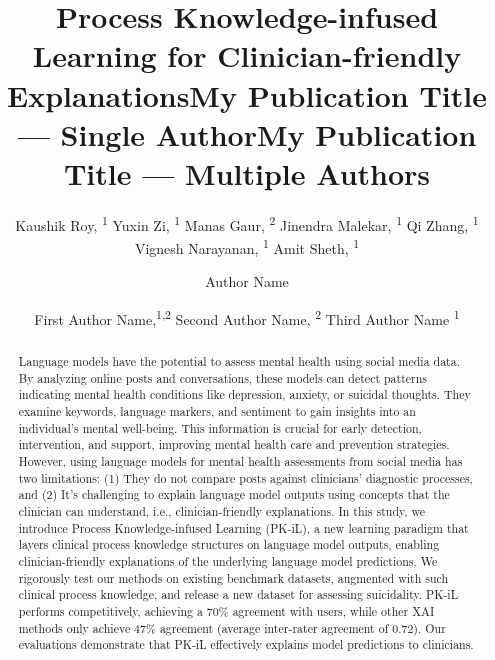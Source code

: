 \documentclass[letterpaper]{article} %
\title{Process Knowledge-infused Learning for Clinician-friendly Explanations}
\author{
    Kaushik Roy, \textsuperscript{\rm 1}
    Yuxin Zi, \textsuperscript{\rm 1}
    Manas Gaur, \textsuperscript{\rm 2}
    Jinendra Malekar, \textsuperscript{\rm 1}
    Qi Zhang, \textsuperscript{\rm 1}
    Vignesh Narayanan, \textsuperscript{\rm 1}
    Amit Sheth, \textsuperscript{\rm 1}
}
\title{My Publication Title --- Single Author}
\author {
    Author Name
}
\title{My Publication Title --- Multiple Authors}
\author {
    First Author Name,\textsuperscript{\rm 1,\rm 2}
    Second Author Name, \textsuperscript{\rm 2}
    Third Author Name \textsuperscript{\rm 1}
}
\begin{document}
\maketitle

\begin{abstract}
Language models have the potential to assess mental health using social media data. By analyzing online posts and conversations, these models can detect patterns indicating mental health conditions like depression, anxiety, or suicidal thoughts. They examine keywords, language markers, and sentiment to gain insights into an individual's mental well-being. This information is crucial for early detection, intervention, and support, improving mental health care and prevention strategies. However, using language models for mental health assessments from social media has two limitations: (1) They do not compare posts against clinicians' diagnostic processes, and (2) It's challenging to explain language model outputs using concepts that the clinician can understand, i.e., clinician-friendly explanations. In this study, we introduce Process Knowledge-infused Learning (PK-iL), a new learning paradigm that layers clinical process knowledge structures on language model outputs, enabling clinician-friendly explanations of the underlying language model predictions. We rigorously test our methods on existing benchmark datasets, augmented with such clinical process knowledge, and release a new dataset for assessing suicidality. PK-iL performs competitively, achieving a 70\% agreement with users, while other XAI methods only achieve 47\% agreement (average inter-rater agreement of 0.72). Our evaluations demonstrate that PK-iL effectively explains model predictions to clinicians.
\end{abstract}
\end{document}
